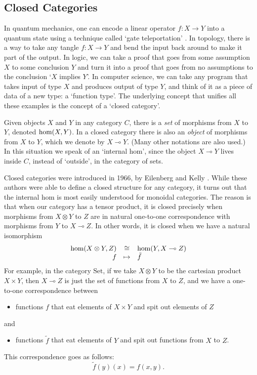 \documentclass[12pt,twoside,openright]{report}
\newcommand{\Set}{\mathrm{Set}}
\newcommand{\maps}{\colon}
\newcommand{\iso}{\cong}
\newcommand{\lhom}{\multimap}
\renewcommand{\hom}{{\rm hom}}
\newcommand{\tensor}{\otimes}
\begin{document}
\subsection{Closed Categories}
\label{closed}

In quantum mechanics, one can encode a linear operator $f \maps X \to Y$ into a quantum state using a technique called `gate teleportation'
\cite{GC}.  In topology, there is a way to take any tangle $f \maps X
\to Y$ and bend the input back around to make it part of the output. In logic, we can take a proof that goes from some assumption $X$ to some conclusion $Y$ and turn it into a proof that goes from no assumptions to the conclusion `$X$ implies $Y$'.  In computer science, we can take any program that takes input of type $X$ and produces output of type $Y$, and think of it as a piece of data of a new type:
a `function type'.  The underlying concept that unifies all these examples is the concept of a `closed category'.

Given objects $X$ and $Y$ in any category $C$, there is a {\em set} of morphisms from $X$ to $Y$, denoted $\hom(X,Y)$.  In a closed category there is also an {\em object} of morphisms from $X$ to $Y$, which we denote by $X \lhom Y$.  (Many other notations are also used.)  In this situation we speak of an `internal hom', since the object $X \lhom Y$
lives inside $C$, instead of `outside', in the category of sets.

Closed categories were introduced in 1966, by Eilenberg and Kelly \cite{EK}. While these authors were able to define a closed structure for any category, it turns out that the internal hom is most easily understood for monoidal categories.  The reason is that when our category has a tensor product, it is closed precisely when morphisms from $X \tensor Y$
to $Z$ are in natural one-to-one correspondence with morphisms from $Y$
to $X \lhom Z$.  In other words, it is closed when we have a natural isomorphism
\[  
\begin{array}{rcl}       
 \hom(X \tensor Y , Z) &\iso & \hom(Y, X \lhom Z)  \\
                    f &\mapsto & \tilde{f}  
\end{array}
\]
For example, in the category $\Set$, if we take
$X \tensor Y$ to be the cartesian product $X \times Y$, then 
$X \lhom Z$ is just the set of functions from $X$ to $Z$, and we have a one-to-one correspondence between
\begin{itemize}
\item functions $f$ that eat elements of
$X \times Y$ and spit out elements of $Z$ 
\end{itemize}
and 
\begin{itemize}
\item functions $\tilde{f}$ that eat elements of $Y$ and spit out functions from $X$ to $Z$.
\end{itemize}
This correspondence goes as follows:
\[          \tilde{f}(y)(x) = f(x,y)  .\]
\end{document}
